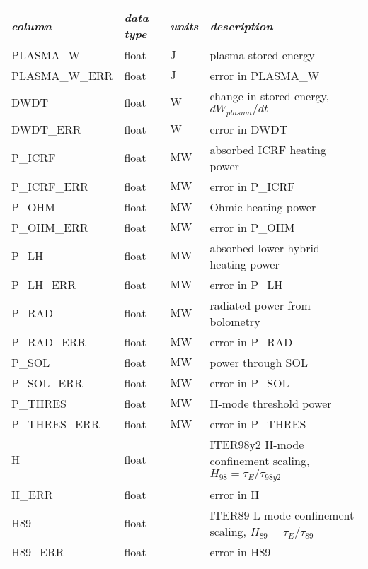 \begin{table*}[h]
 \pushtooutside
 {\begin{tabu} to 143mm {X[2.348,l]X[1,c]X[1,c]X[4.348,c]}
   \toprule
   \emph{column} &
   \emph{data type} &
   \emph{units} &
   \emph{description}
   \\
   \midrule
   PLASMA\_W &
   float &
   $\si{\joule}$ &
   plasma stored energy
   \\
   PLASMA\_W\_ERR &
   float &
   $\si{\joule}$ &
   error in PLASMA\_W
   \\
   DWDT &
   float &
   $\si{\watt}$ &
   change in stored energy, $dW_{plasma}/dt$
   \\
   DWDT\_ERR &
   float &
   $\si{\watt}$ &
   error in DWDT
   \\
   P\_ICRF &
   float &
   $\si{\mega\watt}$ &
   absorbed ICRF heating power
   \\
   P\_ICRF\_ERR &
   float &
   $\si{\mega\watt}$ &
   error in P\_ICRF
   \\
   P\_OHM &
   float &
   $\si{\mega\watt}$ &
   Ohmic heating power
   \\
   P\_OHM\_ERR &
   float &
   $\si{\mega\watt}$ &
   error in P\_OHM
   \\
   P\_LH &
   float &
   $\si{\mega\watt}$ &
   absorbed lower-hybrid heating power
   \\
   P\_LH\_ERR &
   float &
   $\si{\mega\watt}$ &
   error in P\_LH
   \\
   P\_RAD &
   float &
   $\si{\mega\watt}$ &
   radiated power from bolometry
   \\
   P\_RAD\_ERR &
   float &
   $\si{\mega\watt}$ &
   error in P\_RAD
   \\
   P\_SOL &
   float &
   $\si{\mega\watt}$ &
   power through SOL 
   \\
   P\_SOL\_ERR &
   float &
   $\si{\mega\watt}$ &
   error in P\_SOL
   \\
   P\_THRES &
   float &
   $\si{\mega\watt}$ &
   H-mode threshold power 
   \\
   P\_THRES\_ERR &
   float &
   $\si{\mega\watt}$ &
   error in P\_THRES
   \\
   H &
   float &
   &
   ITER98y2 H-mode confinement scaling, $H_{98} = \tau_E / \tau_{98y2}$
   \\
   H\_ERR &
   float &
   &
   error in H
   \\
   H89 &
   float &
   &
   ITER89 L-mode confinement scaling, $H_{89} = \tau_E / \tau_{89}$
   \\
   H89\_ERR &
   float &
   &
   error in H89
   \\
   \bottomrule
  \end{tabu}}
\end{table*}

